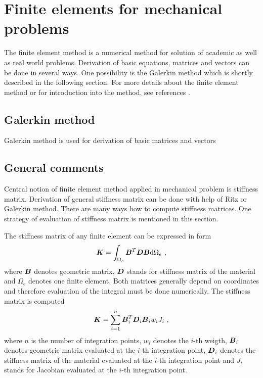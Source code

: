 \chapter{Finite elements for mechanical problems}
\label{finitelements}

The finite element method is a numerical method for solution of academic as well as real world problems.
Derivation of basic equations, matrices and vectors can be done in several ways. One possibility is
the Galerkin method which is shortly described in the following section. For more details about the
finite element method or for introduction into the method, see references
\cite{belytschko:nonlin}.

\section{Galerkin method}


Galerkin method is used for derivation of basic matrices and vectors


\section{General comments}
\label{sectgencom}
Central notion of finite element method applied in mechanical problem is stiffness matrix.
Derivation of general stiffness matrix can be done with help of Ritz or Galerkin method.
There are many ways how to compute stiffness matrices. One strategy of evaluation of
stiffness matrix is mentioned in this section.


The stiffness matrix  of any finite element can be expressed in form
\begin{equation}
\mbox{\boldmath$K$} = \int_{\Omega_e} \mbox{\boldmath$B$}^T \mbox{\boldmath$D$} \mbox{\boldmath$B$} {\rm d}\Omega_e\ ,
\end{equation}
where $\mbox{\boldmath$B$}$ denotes geometric matrix, $\mbox{\boldmath$D$}$ stands for stiffness matrix of the material
and $\Omega_e$ denotes one finite element. Both matrices generally depend on coordinates and therefore
evaluation of the integral must be done numerically. The stiffness matrix is computed
\begin{equation}
\mbox{\boldmath$K$} = \sum_{i=1}^{n} \mbox{\boldmath$B$}_i^T \mbox{\boldmath$D$}_i \mbox{\boldmath$B$}_i w_i J_i\ ,
\end{equation}
where $n$ is the number of integration points, $w_i$ denotes the $i$-th weigth, $\mbox{\boldmath$B$}_i$ denotes
geometric matrix  evaluated at the $i$-th integration point,
$\mbox{\boldmath$D$}_i$ denotes the stiffness matrix of the material  evaluated at the
$i$-th integration point and $J_i$ stands for Jacobian evaluated at the $i$-th integration point.

